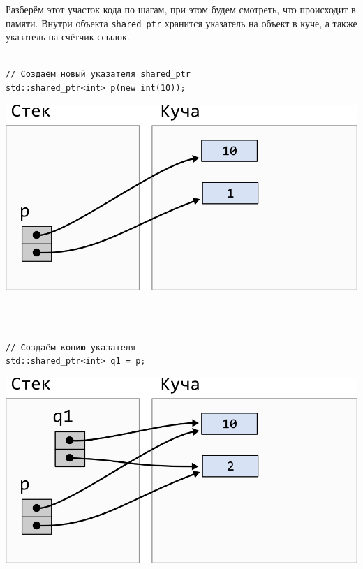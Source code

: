 \documentclass{article}
\begin{document}
Разберём этот участок кода по шагам, при этом будем смотреть, что происходит в памяти. Внутри объекта \texttt{shared\_ptr} хранится указатель на объект в куче, а также указатель на счётчик ссылок.
\quad\\
\quad\\

\begin{minipage}{0.45\textwidth}
\begin{lstlisting}
// Создаём новый указателя shared_ptr
std::shared_ptr<int> p(new int(10));
\end{lstlisting}
\end{minipage}
\begin{minipage}{0.5\textwidth}
\includegraphics[scale=1]{../images/shared_ptr1.png}
\end{minipage}
\quad\\
\quad\\

\begin{minipage}{0.45\textwidth}
\begin{lstlisting}
// Создаём копию указателя
std::shared_ptr<int> q1 = p;
\end{lstlisting}
\end{minipage}
\begin{minipage}{0.5\textwidth}
\includegraphics[scale=1]{../images/shared_ptr2.png}
\end{minipage}
\quad\\
\quad\\
\end{document}
